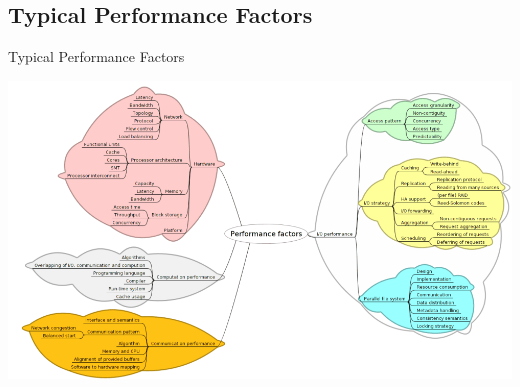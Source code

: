 \documentclass[compress,11pt,xcolor=svgnames,aspectratio=169]{beamer}
\begin{document}
\subsection{Typical Performance Factors}

\begin{frame}[fragile] {Typical Performance Factors}

\begin{center}
\includegraphics[scale=0.44]{fig/tree-perf}
\end{center}

\nocite{SOPPOAASLK13}

\end{frame}
\end{document}
